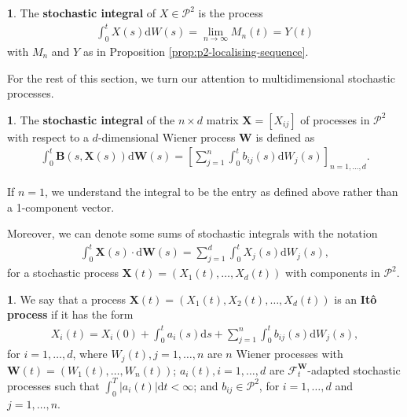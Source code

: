 \documentclass[english]{article}
\newcommand{\comment}[1]{\color{blue}#1\color{black}}
\numberwithin{equation}{section}
\numberwithin{figure}{section}
\theoremstyle{bolddescit}
\theoremstyle{definition}
\newtheorem{definition}[theorem]{\protect\definitionname}
\theoremstyle{definition}
\theoremstyle{plain}
\theoremstyle{plain}
\theoremstyle{bolddesc}
\theoremstyle{plain}
\theoremstyle{remark}
\providecommand{\definitionname}{Definition}
\begin{document}
\begin{definition}
  The \textbf{stochastic integral} of $X \in \mathcal{P}^2$ is the process
  \begin{align*}
    \int_0^t X(s) \mathrm{d}W(s) = \lim_{n \to \infty} M_n(t) = Y(t)
  \end{align*}
  with $M_n$ and $Y$ as in Proposition \ref{prop:p2-localising-sequence}.
\end{definition}


For the rest of this section, we turn our attention to multidimensional stochastic processes.

\begin{definition}
  The \textbf{stochastic integral} of the $n \times d$ matrix $\mathbf{X} = [X_{ij}]$ of processes in $\mathcal{P}^2$ with respect to a $d$-dimensional Wiener process $\mathbf{W}$ is defined as
  \begin{align*}
    \int_0^t \mathbf{B}(s,\mathbf{X}(s)) \mathrm{d}\mathbf{W}(s) = \left[
      \sum_{j=1}^{n} \int_0^t b_{ij}(s) \mathrm{d}W_j(s)
    \right]_{n=1,\ldots,d}.
  \end{align*}
\end{definition}

If $n=1$, we understand the integral to be the entry as defined above rather than a 1-component vector.

Moreover, we can denote some sums of stochastic integrals with the notation
\begin{align*}
  \int_0^t \mathbf{X}(s) \cdot \mathrm{d}\mathbf{W}(s) = \sum_{j=1}^{d} \int_0^t X_j(s) \mathrm{d}W_j(s),
\end{align*}
for a stochastic process $\mathbf{X}(t) = (X_1(t), \ldots, X_d(t))$ with components in $\mathcal{P}^2$.

\begin{definition}
  We say that a process $\mathbf{X}(t) = (X_1(t), X_2(t), \ldots, X_d(t))$ is an \textbf{It\^o process} if it has the form
  \begin{align}\label{eq:ito-process}
    X_i(t) = X_i(0) + \int_0^t a_i(s) \mathrm{d}s + \sum_{j=1}^n \int_0^t b_{ij}(s) \mathrm{d}W_j(s),
  \end{align}
  for $i=1,\ldots,d$, where $W_j(t), j=1,\ldots,n$ are $n$ Wiener processes with $\mathbf{W}(t) = (W_1(t),\ldots,W_n(t))$; $a_i(t), i=1,\ldots,d$ are $\mathcal{F}^\mathbf{W}_t$-adapted stochastic processes such that $\int_0^T |a_i(t)| \mathrm{d}t < \infty$; and $b_{ij} \in \mathcal{P}^2$, for $i=1,\ldots,d$ and $j=1,\ldots,n$.
\end{definition}
\end{document}
